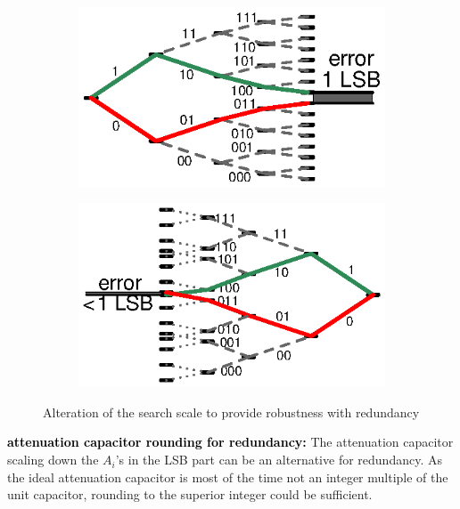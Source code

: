 \begin{figure}[htp]
	\centering
	\begin{subfigure}[b]{0.48\textwidth}
		\includegraphics[width=\textwidth]{Chapter4/Figs/sar-binary-scale.ps}
		\label{fig:std-scale}
	\end{subfigure}
	\begin{subfigure}[b]{0.48\textwidth}
		\includegraphics[width=\textwidth]{Chapter4/Figs/sar-non-binary-scale.ps}
		\label{fig:altered-scale-1}
	\end{subfigure}
	\caption{Alteration of the search scale to provide robustness with redundancy}
	\label{fig:sar-redundancy}
\end{figure}

\textbf{\textcolor{black}{attenuation capacitor rounding for redundancy:}}
The attenuation capacitor scaling down the \(A_i\)'s in the LSB part can be an alternative for redundancy. As the ideal attenuation capacitor is most of the time not an integer multiple of the unit capacitor, rounding to the superior integer could be sufficient.

